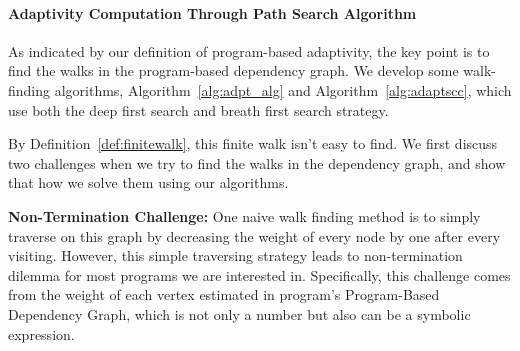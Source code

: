 \paragraph*{Adaptivity Computation Through Path Search Algorithm}
As indicated by our definition of program-based adaptivity, the key point is to find the walks in the program-based dependency graph. We develop some walk-finding algorithms,  Algorithm~\ref{alg:adpt_alg} and Algorithm~\ref{alg:adaptscc}, which use both the deep first search and breath first search strategy.  

By Definition~\ref{def:finitewalk}, this finite walk isn't easy to find. We first discuss two challenges when we try to find the walks in the dependency graph, and show that how we solve them using our algorithms.

\textbf{Non-Termination Challenge:}
One naive walk finding method is to simply traverse on this graph by decreasing the weight of every node by one after every visiting. However, this simple 
traversing strategy leads to non-termination dilemma for most programs we are interested in. 
Specifically, this challenge comes from the weight of each vertex estimated in program's Program-Based Dependency Graph,
which is not only a number but also can be a symbolic expression. 

